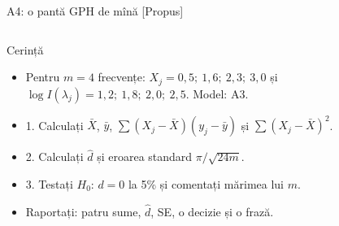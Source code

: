 \begin{frame}{A4: o pantă GPH de mînă [Propus]}
\propsub
\itemsize{\scriptsize}
\begin{columns}[T]
\begin{column}{\taskw}
\begin{block}{Cerință}
\begin{itemize}
    \item Pentru $m = 4$ frecvențe: $X_j = 0{,}5;\ 1{,}6;\ 2{,}3;\ 3{,}0$ și $\log I(\lambda_j) = 1{,}2;\ 1{,}8;\ 2{,}0;\ 2{,}5$. Model: A3.
    \item 1. Calculați $\bar X$, $\bar y$, $\sum(X_j - \bar X)(y_j - \bar y)$ și $\sum(X_j - \bar X)^2$.
    \item 2. Calculați $\hat d$ și eroarea standard $\pi/\sqrt{24m}$.
    \item 3. Testați $H_0$: $d = 0$ la 5\% și comentați mărimea lui $m$.
    \item Raportați: patru sume, $\hat d$, SE, o decizie și o frază.
\end{itemize}
\end{block}
\end{column}
\begin{column}{\solw}
\end{column}
\end{columns}
\end{frame}

